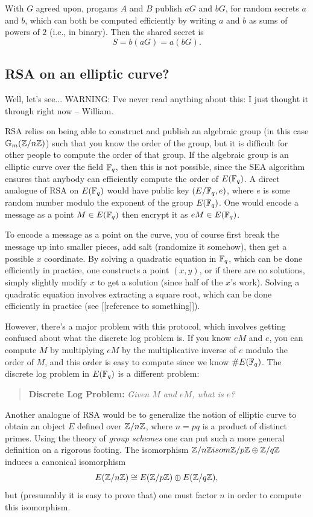 \documentclass{book}
\begin{document}
With $G$ agreed upon, progams $A$ and $B$ publish
$aG$ and $bG$, for random secrets $a$ and $b$,
which can both be computed efficiently by writing
$a$ and $b$ as sums of powers of $2$ (i.e., in binary).
Then the shared secret is
$$
S=b (a G) = a (b G).
$$


\subsection{RSA on an elliptic curve?}
Well, let's see...  WARNING: I've never
read anything about this: I just thought it through right now -- William.

RSA relies on being able to construct and publish
an algebraic
group (in this case $\mathbb{G}_m(\mathbb{Z}/n\mathbb{Z})$)
such that you know the order of the group,
but it is difficult for other people to compute
the order of that group.
If the algebraic group is an elliptic curve over
the field $\mathbb{F}_q$, then this is not possible,
since the SEA algorithm ensures that anybody can efficiently
compute the order of $E(\mathbb{F}_q)$.
A direct analogue of RSA on $E(\mathbb{F}_q)$ would
have public key $(E/\mathbb{F}_q, e)$, where $e$
is some random number modulo the exponent
of the group $E(\mathbb{F}_q)$.
One would encode a message as a point $M \in E(\mathbb{F}_q)$
then encrypt it as $e M \in E(\mathbb{F}_q)$.

To encode a message as a point on the curve, you of course
first break the message up into smaller pieces, add salt (randomize it somehow), then get a possible $x$ coordinate.  By solving a quadratic
equation in $\mathbb{F}_q$, which can be done efficiently in practice, one
constructs a point $(x,y)$, or if there are no solutions, simply slightly
modify $x$ to get a solution (since half of the $x$'s work).  Solving
a quadratic equation involves extracting a square root, which can be done
efficiently in practice (see [[reference to something]]).

However, there's a major problem with this protocol, which involves
getting confused about what the discrete log problem is.
If you know $e M$ and $e$, you can
compute $M$ by multiplying $e M$ by the multiplicative
inverse of $e$ modulo the order of $M$, and this order
is easy to compute since we know $\# E(\mathbb{F}_q)$.
The discrete log problem in $E(\mathbb{F}_q)$ is a different problem:
\begin{quote}
{\bf Discrete Log Problem: } {\em Given $M$ and $e M$, what is $e$?}
\end{quote}

Another analogue of RSA would be to generalize the
notion of elliptic curve to obtain an object
$E$ defined over $\mathbb{Z}/n\mathbb{Z}$,
where $n=pq$ is a product of distinct primes.
Using the theory of {\em group schemes} one can
put such a more general definition on a rigorous footing.
The isomorphism $\mathbb{Z}/n\mathbb{Z}\\isom \mathbb{Z}/p\mathbb{Z} \oplus \mathbb{Z}/q\mathbb{Z}$ induces
a canonical isomorphism
\begin{equation}\label{eq:ellisom}
  E(\mathbb{Z}/n\mathbb{Z}) \cong E(\mathbb{Z}/p\mathbb{Z}) \oplus E(\mathbb{Z}/q\mathbb{Z}),
\end{equation}
but (presumably it is easy to prove that)
one must factor $n$ in order to compute
this isomorphism.
\end{document}

